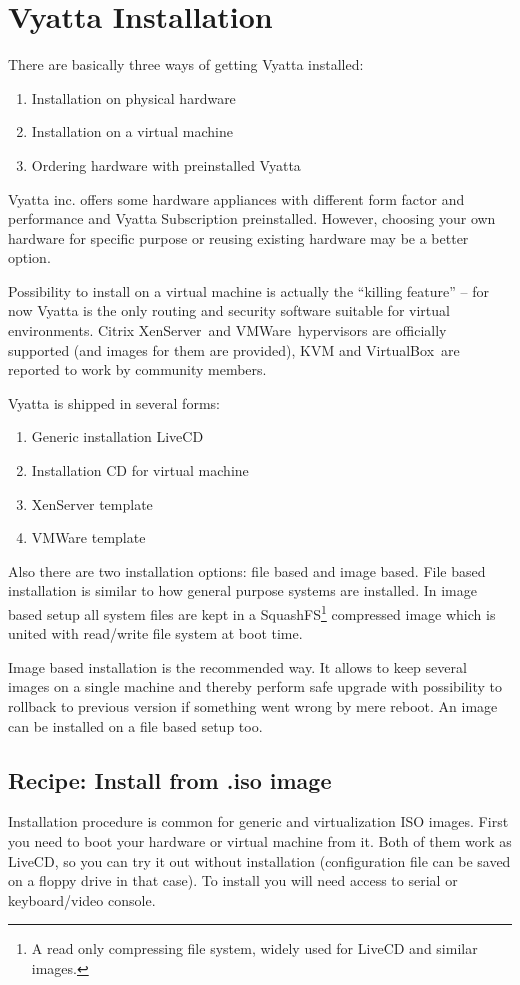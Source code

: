 \chapter{Vyatta Installation}
There are basically three ways of getting Vyatta installed:
\begin{enumerate}
 \item Installation on physical hardware
 \item Installation on a virtual machine
 \item Ordering hardware with preinstalled Vyatta
\end{enumerate}

Vyatta inc. offers some hardware appliances with different form factor and performance and Vyatta Subscription
preinstalled. However, choosing your own hardware for specific purpose or reusing existing hardware may be a better
option. 

Possibility to install on a virtual machine is actually the ``killing feature'' -- for now Vyatta is the only
routing and security software suitable for virtual environments. Citrix XenServer\texttrademark\ and 
VMWare\texttrademark\ hypervisors are officially supported (and images for them are provided), KVM and 
VirtualBox\texttrademark\ are reported to work by community members.

Vyatta is shipped in several forms:
\begin{enumerate}
 \item Generic installation LiveCD
 \item Installation CD for virtual machine
 \item XenServer template
 \item VMWare template
\end{enumerate}

Also there are two installation options: file based and image based. File based installation is similar to how 
general purpose systems are installed. In image based setup all system files are kept in a 
SquashFS\footnote{A read only compressing file system, widely used for LiveCD and similar images.} compressed image
which is united with read/write file system at boot time.

Image based installation is the recommended way. It allows to keep several images on a single machine and thereby 
perform safe upgrade with possibility to rollback to previous version if something went wrong by mere reboot. An image
can be installed on a file based setup too.

\section{Recipe: Install from .iso image}
\solution
Installation procedure is common for generic and virtualization ISO images. First you need to boot your hardware or
virtual machine from it. Both of them work as LiveCD, so you can try it out without installation (configuration file
can be saved on a floppy drive in that case). To install you will need access to serial or keyboard/video console.

